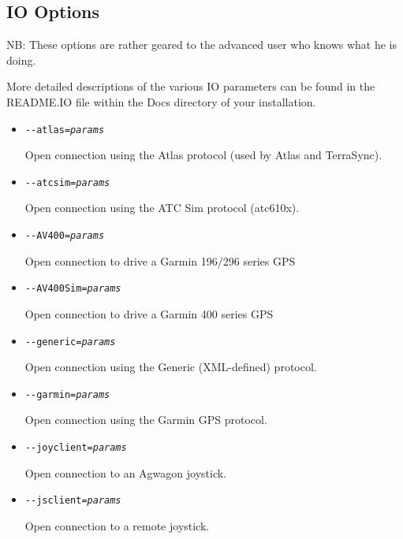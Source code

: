 {
  \subsection{IO Options}

  NB: These options are rather geared to the advanced user who knows what he is doing.

  More detailed descriptions of the various IO parameters can be found in the README.IO file
  within the Docs directory of your \FlightGear{} installation.

  \begin{itemize}

  \item{\texttt{-$ $-atlas={\it params}}}

    Open connection using the Atlas protocol (used by Atlas and TerraSync).

  \item{\texttt{-$ $-atcsim={\it params}}}

    Open connection using the ATC Sim protocol (atc610x).

  \item{\texttt{-$ $-AV400={\it params}}}

    Open connection to drive a Garmin 196/296 series GPS

  \item{\texttt{-$ $-AV400Sim={\it params}}}

    Open connection to drive a Garmin 400 series GPS

  \item{\texttt{-$ $-generic={\it params}}}

    Open connection using the Generic (XML-defined) protocol.

  \item{\texttt{-$ $-garmin={\it params}}}

    Open connection using the Garmin GPS protocol.

  \item{\texttt{-$ $-joyclient={\it params}}}

    Open connection to an Agwagon joystick.

  \item{\texttt{-$ $-jsclient={\it params}}}

    Open connection to a remote joystick.


\end{itemize}}
